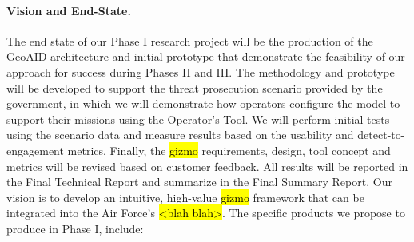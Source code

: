 \documentclass{sbir}
\begin{document}
\paragraph{Vision and End-State.} The end state of our Phase I research project will be the production of the GeoAID architecture and initial prototype that demonstrate the feasibility of our approach for success during Phases II and III. The methodology and prototype will be developed to support  the threat prosecution scenario provided by the government, in which we will demonstrate how operators configure the model to support their missions using the Operator's Tool. We will perform initial tests using the scenario data and measure results based on the usability and detect-to-engagement metrics. Finally, the \hl{gizmo} requirements, design, tool concept and metrics will be revised based on customer feedback. All results will be reported in the Final Technical Report and summarize in the Final Summary Report.
Our vision is to develop an intuitive, high-value \hl{gizmo} framework that can be integrated into the Air Force's  \hl{<blah blah>}. The specific products we propose to produce in Phase I, include:
\end{document}
